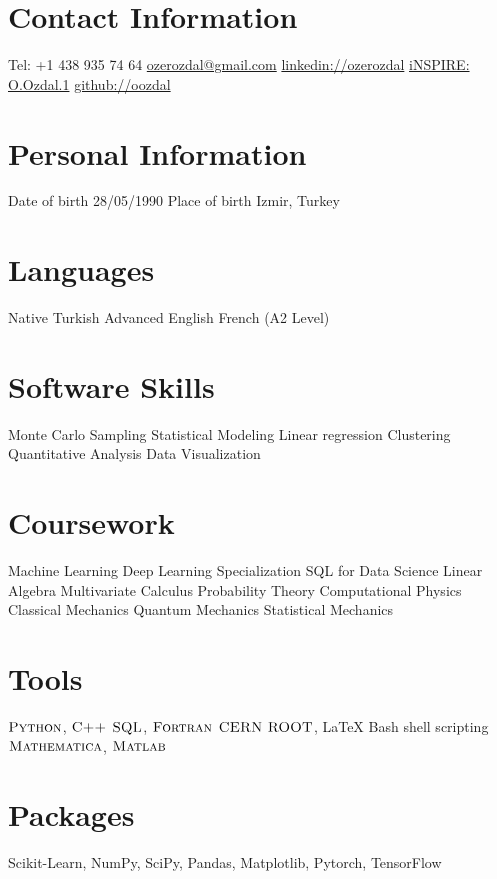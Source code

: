 \documentclass[]{friggeri-cv}
\begin{document}


\begin{aside}
	\section{Contact Information}
	Tel: +1 438 935 74 64
	\href{mailto:ozerozdal@gmail.com}{ozerozdal@gmail.com}
	\href{http://www.linkedin.com/in/ozerozdal/}{linkedin://ozerozdal}
	\href{https://inspirehep.net/author/profile/O.Ozdal.1}{iNSPIRE: O.Ozdal.1}
	\href{http://github.com/oozdal}{github://oozdal}
	\section{Personal Information}
	\bullet Date of birth 
	28/05/1990
	\bullet Place of birth
	Izmir, Turkey
	\section{Languages}
	Native Turkish
	Advanced English 
	French (A2 Level)
	\section{Software Skills}
	Monte Carlo Sampling
	Statistical Modeling
	Linear regression
	Clustering     
	Quantitative Analysis    
	Data Visualization
	\section{Coursework}  
	\bullet Machine Learning
	\bullet Deep Learning Specialization
	\bullet SQL for Data Science
	\bullet Linear Algebra
	\bullet Multivariate Calculus
	\bullet Probability Theory
	\bullet Computational Physics    
	\bullet Classical Mechanics
	\bullet Quantum Mechanics
	\bullet Statistical Mechanics
	\section{Tools}
	$\textsc{Python}$, $\textsc{C++}$ 
	$\textsc{SQL}$, $\textsc{Fortran}$
	$\textsc{CERN ROOT}$, LaTeX   
	Bash shell scripting
	$\textsc{Mathematica}$,  $\textsc{Matlab}$
	\section{Packages}  
	Scikit-Learn,
	NumPy, SciPy,
	Pandas, Matplotlib,
	Pytorch, TensorFlow    
\end{aside}
\end{document}
